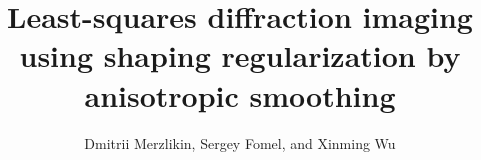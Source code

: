 
\renewcommand{\thefootnote}{\fnsymbol{footnote}}

\title{Least-squares diffraction imaging using shaping regularization by anisotropic smoothing}

\author{Dmitrii Merzlikin\footnotemark[1], Sergey Fomel\footnotemark[2], and Xinming Wu\footnotemark[3]}

\address{
\footnotemark[1]Formerly Bureau of Economic Geology \\
John A. and Katherine G. Jackson School of Geosciences \\
The University of Texas at Austin \\
University Station, Box X \\
Austin, Texas 78713-8924, USA; \\
presently WesternGeco \\
Schlumberger \\
3750 Briarpark Drive \\
Houston, Texas 77042, USA\\
E-mail: dmitrii.merzlikin@utexas.edu (corresponding author)
\footnotemark[2]Bureau of Economic Geology \\
John A. and Katherine G. Jackson School of Geosciences \\
The University of Texas at Austin \\
University Station, Box X \\
Austin, Texas 78713-8924, USA \\
\footnotemark[3]Formerly Bureau of Economic Geology \\
John A. and Katherine G. Jackson School of Geosciences \\
The University of Texas at Austin \\
University Station, Box X \\
Austin, Texas 78713-8924, USA; \\
presently School of Earth and Space Sciences \\
University of Science and Technology of China \\
Hefei, China \\
}


\maketitle

